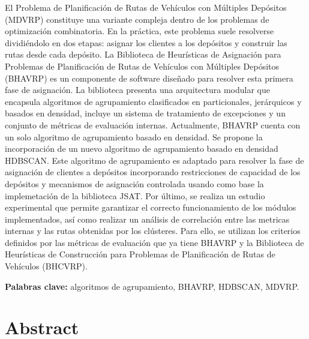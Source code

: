 \documentclass[12pt,letterpaper,oneside]{report}
\begin{document}
El Problema de Planificación de Rutas de Vehículos con Múltiples Depósitos (MDVRP) constituye una variante compleja dentro de los problemas de optimización combinatoria. En la práctica, este problema suele resolverse dividiéndolo en dos etapas: asignar los clientes a los depósitos y construir las rutas desde cada depósito. La Biblioteca de Heurísticas de Asignación para Problemas de Planificación de Rutas de Vehículos con Múltiples Depósitos (BHAVRP) es un componente de software dise\~nado para resolver esta primera fase de asignación. La biblioteca presenta una arquitectura modular que encapsula algoritmos de agrupamiento clasificados en particionales, jerárquicos y basados en densidad, incluye un sistema de tratamiento de excepciones y un conjunto de métricas de evaluación internas. Actualmente, BHAVRP  cuenta con un solo algoritmo de agrupamiento basado en densidad. Se propone la incorporación de un nuevo algoritmo de agrupamiento basado en densidad HDBSCAN. Este algoritmo de agrupamiento es adaptado para resolver la fase de asignación de clientes a depósitos incorporando restricciones de capacidad de los depósitos y mecanismos de asignación controlada usando como base la implemetación de la biblioteca JSAT. Por último, se realiza un estudio experimental que permite garantizar el correcto funcionamiento de los módulos implementados, así como realizar un análisis de correlación entre las metricas internas y las rutas obtenidas por los clústeres. Para ello, se utilizan los criterios definidos por las métricas de evaluación que ya tiene BHAVRP y la Biblioteca de Heurísticas de Construcción para Problemas de Planificación de Rutas de Vehículos (BHCVRP).

\vspace{12pt}
\noindent\textbf{Palabras clave:} algoritmos de agrupamiento, BHAVRP, HDBSCAN, MDVRP.

\chapter*{Abstract}
\end{document}
